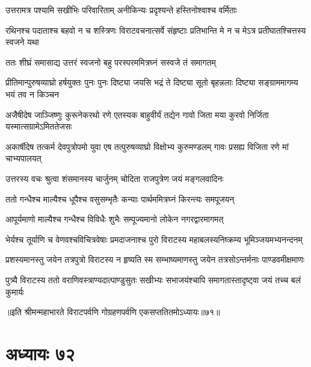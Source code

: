 \twolineshloka
{उत्तरामत्र पश्यामि सखीभिः परिवारिताम्}
{अनीकिन्यः प्रदृश्यन्ते हस्तिनोश्वाश्च वर्मिताः}


\threelineshloka
{रथिनश्च पदाताश्च बहवो न च शस्त्रिणः}
{विराटवचनात्सर्वे संहृष्टाः प्रतिभान्ति मे}
{न च मेऽत्र प्रतीघातश्चित्तस्य स्वजने यथा}



\twolineshloka
{ततः शीघ्रं समासाद्य उत्तरं स्वजनो बहु}
{परस्परममित्रघ्नं सस्वजे तं समागतम्}




\threelineshloka
{प्रीतिमान्पुरुषव्याघ्रो हर्षयुक्तः पुनः पुनः}
{दिष्ट्या जयसि भद्रं ते दिष्ट्या सूतो बृहन्नलाः}
{दिष्ट्या सङ्ग्राममागम्य भयं तव न किञ्चन}




\threelineshloka
{अजैषीदेष जाञ्जिष्णुः कुरूनेकरथो रणे}
{एतस्यक बाहुवीर्यं तद्येन गावो जिता मया}
{कुरवो निर्जिता यस्मात्सग्रामेऽमिततेजसः}


\threelineshloka
{अकार्षीदेष तत्कर्म देवपुत्रोपमो युवा}
{एष तत्पुरुषव्याघ्रो विक्षोभ्य कुरुमण्डलम्}
{गावः प्रसह्य विजिता रणे मां चाभ्यपालयत्}



\twolineshloka
{उत्तरस्य वचः श्रुत्वा शंसमानस्य चार्जुनम्}
{चोदिता राजपुत्रेण जयं मङ्गलवादिनः}


\twolineshloka
{ततो गन्धैश्च माल्यैश्च धूपैश्च वसुसम्भृतैः}
{कन्याः पार्थममित्रघ्नं किरन्त्यः समपूजयन्}


\twolineshloka
{आपूर्यमाणो माल्यैश्च गन्धैश्च विविधैः शुभैः}
{सम्पूज्यमानो लोकेन नगरद्वारमागमत्}


\twolineshloka
{भेर्यश्च तूर्याणि च वेणवश्चविचित्रवेषाः प्रमदाजनाश्च}
{पुरो विराटस्य महाबलस्यनिष्क्रम्य भूमिञ्जयमभ्यनन्दनम्}


\twolineshloka
{प्रशस्यमानस्तु जयेन तत्रपुत्रो विराटस्य न हृष्यति स्म}
{सम्भाष्यमाणस्तु जयेन तत्रसोऽन्तर्मनाः पाण्डवमीक्षमाणः}


\twolineshloka
{पुत्र्यै विराटस्य ततो वराणिवस्त्राण्यदात्पाण्डुसुतः सखीभ्यः}
{सभाजयंश्चापि समागतास्तादृष्ट्वा जयं तच्च बलं कुमार्यः}

॥इति श्रीमन्महाभारते विराटपर्वणि गोग्रहणपर्वणि एकसप्ततितमोऽध्यायः॥७१॥

\chapter{अध्यायः ७२}

